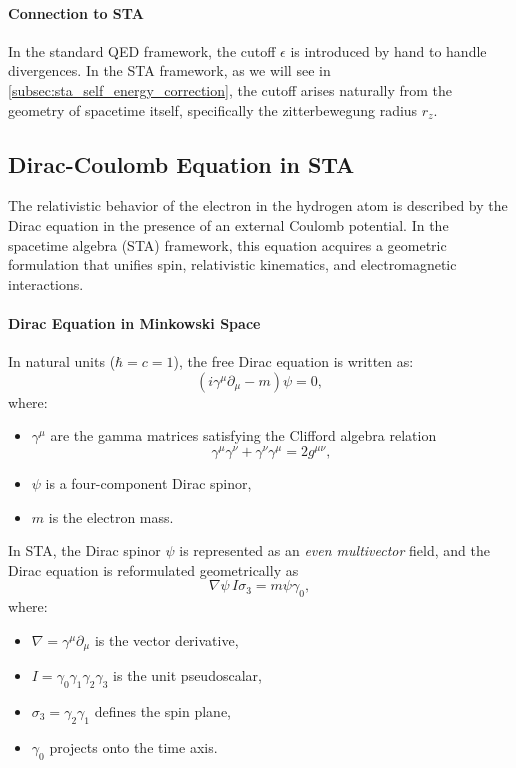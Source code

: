 \documentclass[12pt]{article}
\begin{document}
\paragraph{Connection to STA}
In the standard QED framework, the cutoff \(\epsilon\) is introduced by hand to handle divergences. In the STA framework, as we will see in \ref{subsec:sta_self_energy_correction}, the cutoff arises naturally from the geometry of spacetime itself, specifically the zitterbewegung radius \(r_z\).

\subsection{Dirac-Coulomb Equation in STA}\label{subsec:dirac_coulomb_sta}

The relativistic behavior of the electron in the hydrogen atom is described by the Dirac equation in the presence of an external Coulomb potential. In the spacetime algebra (STA) framework, this equation acquires a geometric formulation that unifies spin, relativistic kinematics, and electromagnetic interactions.

\paragraph{Dirac Equation in Minkowski Space}
In natural units (\(\hbar = c = 1\)), the free Dirac equation is written as:
\[
(i\gamma^\mu\partial_\mu - m)\psi = 0,
\]
where:
\begin{itemize}
    \item \(\gamma^\mu\) are the gamma matrices satisfying the Clifford algebra relation
    \[
    \gamma^\mu\gamma^\nu + \gamma^\nu\gamma^\mu = 2g^{\mu\nu},
    \]
    \item \(\psi\) is a four-component Dirac spinor,
    \item \(m\) is the electron mass.
\end{itemize}

In STA, the Dirac spinor \(\psi\) is represented as an \emph{even multivector} field, and the Dirac equation is reformulated geometrically as
\[
\nabla\psi\,I\sigma_3 = m\psi\gamma_0,
\]
where:
\begin{itemize}
    \item \(\nabla = \gamma^\mu\partial_\mu\) is the vector derivative,
    \item \(I = \gamma_0\gamma_1\gamma_2\gamma_3\) is the unit pseudoscalar,
    \item \(\sigma_3 = \gamma_2\gamma_1\) defines the spin plane,
    \item \(\gamma_0\) projects onto the time axis.
\end{itemize}
\end{document}
